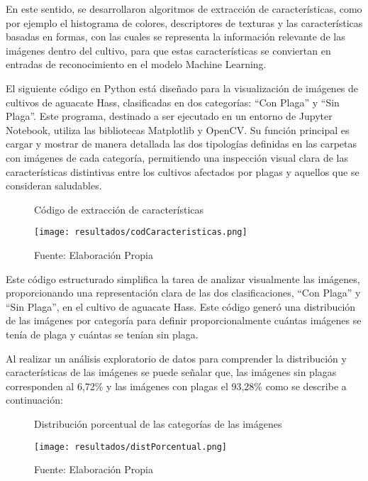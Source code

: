 En este sentido, se desarrollaron algoritmos de extracción de características, como por ejemplo el histograma de colores, descriptores de texturas y las características basadas en formas, con las cuales se representa la información relevante de las imágenes dentro del cultivo, para que estas características se conviertan en entradas de reconocimiento en el modelo Machine Learning.

El siguiente código en Python está diseñado para la visualización de imágenes de cultivos de aguacate Hass, clasificadas en dos categorías: ``Con Plaga'' y ``Sin Plaga''. Este programa, destinado a ser ejecutado en un entorno de Jupyter Notebook, utiliza las bibliotecas Matplotlib y OpenCV. Su función principal es cargar y mostrar de manera detallada las dos tipologías definidas en las carpetas con imágenes de cada categoría, permitiendo una inspección visual clara de las características distintivas entre los cultivos afectados por plagas y aquellos que se consideran saludables.

\newpage

\begin{figure}[h]
\centering
\caption{Código de extracción de características}
\texttt{[image: resultados/codCaracteristicas.png]}
\caption*{\footnotesize Fuente: Elaboración Propia}
\label{fig:figuraCodCaracteristicas}
\end{figure}

Este código estructurado simplifica la tarea de analizar visualmente las imágenes, proporcionando una representación clara de las dos clasificaciones, ``Con Plaga'' y ``Sin Plaga'', en el cultivo de aguacate Hass. Este código generó una distribución de las imágenes por categoría para definir proporcionalmente cuántas imágenes se tenía de plaga y cuántas se tenían sin plaga.

Al realizar un análisis exploratorio de datos para comprender la distribución y características de las imágenes se puede señalar que, las imágenes sin plagas corresponden al 6,72\% y las imágenes con plagas el 93,28\% como se describe a continuación:

\newpage

\begin{figure}[h]
\centering
\caption{Distribución porcentual de las categorías de las imágenes}
\texttt{[image: resultados/distPorcentual.png]}
\caption*{\footnotesize Fuente: Elaboración Propia}
\label{fig:figuraDistPorcentual}
\end{figure}

